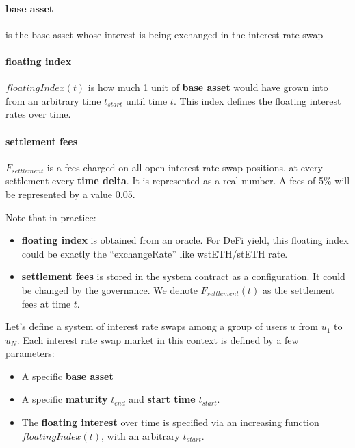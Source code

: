 \documentclass{article}%
\begin{document}
\paragraph{base asset} is the base asset whose interest is being exchanged in the interest rate swap
\paragraph{floating index} $floatingIndex(t)$ is how much 1 unit of \textbf{base asset} would have grown into from an arbitrary time $t_{start}$ until time $t$. This index defines the floating interest rates over time.
\paragraph{settlement fees} $F_{settlement}$ is a fees charged on all open interest rate swap positions, at every settlement every \textbf{time delta}. It is represented as a real number. A fees of 5\% will be represented by a value 0.05.

Note that in practice:
\begin{itemize}
    \item \textbf{floating index} is obtained from an oracle. For DeFi yield, this floating index could be exactly the ``exchangeRate'' like wstETH/stETH rate.
    \item \textbf{settlement fees} is stored in the system contract as a configuration. It could be changed by the governance. We denote $F_{settlement}(t)$ as the settlement fees at time $t$.
\end{itemize}

Let's define a system of interest rate swaps among a group of users $u$ from $u_1$ to $u_{N}$. Each interest rate swap market in this context is defined by a few parameters:
\begin{itemize}
    \item A specific \textbf{base asset}
    \item A specific \textbf{maturity} $t_{end}$ and \textbf{start time} $t_{start}$.
    \item The \textbf{floating interest} over time is specified via an increasing function $floatingIndex(t)$, with an arbitrary $t_{start}$.
\end{itemize}
\end{document}

